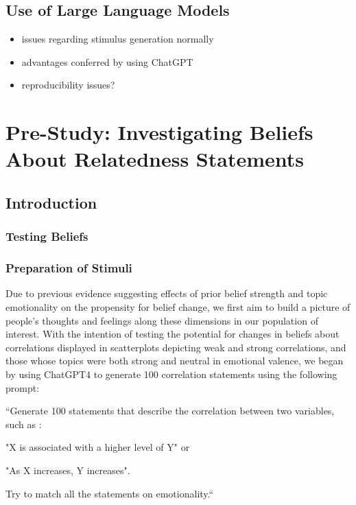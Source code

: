 \documentclass[manuscript,screen,review]{acmart}
\providecommand{\tightlist}{%
  \setlength{\itemsep}{0pt}\setlength{\parskip}{0pt}}\usepackage{longtable,booktabs,array}
\begin{document}
\subsection{Use of Large Language
Models}\label{use-of-large-language-models}

\begin{itemize}
\tightlist
\item
  issues regarding stimulus generation normally
\item
  advantages conferred by using ChatGPT
\item
  reproducibility issues?
\end{itemize}

\section{Pre-Study: Investigating Beliefs About Relatedness
Statements}\label{sec-pre-study}

\subsection{Introduction}\label{sec-pre-study-intro}

\subsubsection{Testing Beliefs}\label{sec-testing-beliefs}

\subsubsection{Preparation of Stimuli}\label{sec-stim-prep-pre}

Due to previous evidence suggesting effects of prior belief strength and
topic emotionality on the propensity for belief change, we first aim to
build a picture of people's thoughts and feelings along these dimensions
in our population of interest. With the intention of testing the
potential for changes in beliefs about correlations displayed in
scatterplots depicting weak and strong correlations, and those whose
topics were both strong and neutral in emotional valence, we began by
using ChatGPT4 \citep{chatgpt} to generate 100 correlation statements
using the following prompt:

\begin{flushleft}

    ``Generate 100 statements that describe the correlation between two variables, such as :

     "X is associated with a higher level of Y" or

     "As X increases, Y increases".

    Try to match all the statements on emotionality.``
    
\end{flushleft}
\end{document}
